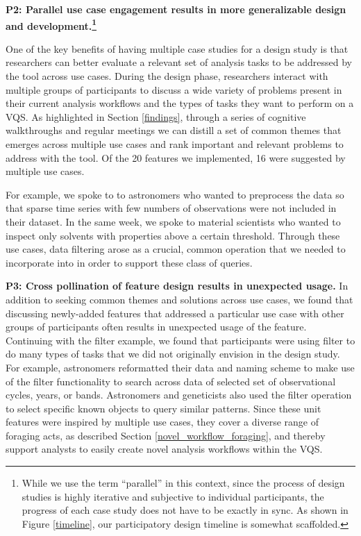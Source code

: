 {\textbf{P2: Parallel use case engagement results in more generalizable design and development.\footnote{While we use the term ``parallel'' in this context, since the process of design studies is highly iterative and subjective to individual participants, the progress of each case study does not have to be exactly in sync. As shown in Figure \ref{timeline}, our participatory design timeline is somewhat scaffolded.}}
\par One of the key benefits of having multiple case studies for a design study is that researchers can better evaluate a relevant set of analysis tasks to be addressed by the tool across use cases. During the design phase, researchers interact with multiple groups of participants to discuss a wide variety of problems present in their current analysis workflows and the types of tasks they want to perform on a VQS. As highlighted in Section \ref{findings}, through a series of cognitive walkthroughs and regular meetings we can distill a set of common themes that emerges across multiple use cases and rank important and relevant problems to address with the tool. Of the 20 features we implemented, 16 were suggested by multiple use cases. 
\par For example, we spoke to to astronomers who wanted to preprocess the data so that sparse time series with few numbers of observations were not included in their dataset. In the same week, we spoke to material scientists who wanted to inspect only solvents with properties above a certain threshold. Through these use cases, data filtering arose as a crucial, common operation that we needed to incorporate into \zv in order to support these class of queries.
\par \textbf{P3: Cross pollination of feature design results in unexpected usage.}
In addition to seeking common themes and solutions across use cases, we found that discussing newly-added features that addressed a particular use case with other groups of participants often results in unexpected usage of the feature. Continuing with the filter example, we found that  participants were using filter to do many types of tasks that we did not originally envision in the design study. For example, astronomers reformatted their data and naming scheme to make use of the filter functionality to search across data of selected set of observational cycles, years, or bands. Astronomers and geneticists also used the filter operation to select specific known objects to query similar patterns. Since these unit features were inspired by multiple use cases, they cover a diverse range of foraging acts, as described Section \ref{novel_workflow_foraging}, and thereby support analysts to easily create novel analysis workflows within the VQS.
}
